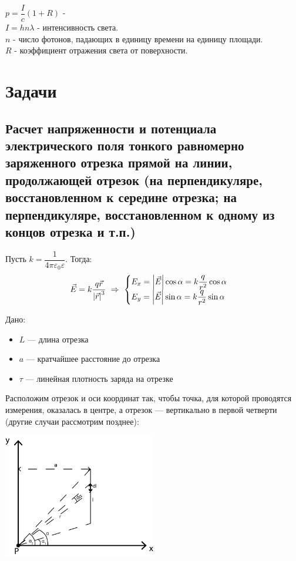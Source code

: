 \documentclass[12pt]{report}
\begin{document}
$p=\dfrac{I}{c}(1+R)$ - \\

$I=hn\lambda$ - интенсивность света.\\

$n$ - число фотонов, падающих в единицу времени на единицу
площади.\\

$R$ - коэффициент отражения света от поверхности.

\chapter{Задачи}
\section{Расчет напряженности и потенциала электрического поля тонкого равномерно заряженного отрезка прямой на линии, продолжающей отрезок (на перпендикуляре, восстановленном к середине отрезка; на перпендикуляре, восстановленном к одному из концов отрезка и т.п.)}
Пусть $k = \dfrac{1}{4\pi \varepsilon_0 \varepsilon}$. Тогда:
\[
    \vec{E} = k\dfrac{q\vec{r}}{\abs{\vec{r}}^3} \ \Rightarrow\ \begin{cases}
        E_x = \abs{\vec{E}} \cos{\alpha} = k\dfrac{q}{r^2} \cos{\alpha} \\
        E_y = \abs{\vec{E}} \sin{\alpha} = k\dfrac{q}{r^2} \sin{\alpha}
    \end{cases}
\]

Дано:
\begin{itemize}
    \item $L$ --- длина отрезка
    \item $a$ --- кратчайшее расстояние до отрезка
    \item $\tau$ --- линейная плотность заряда на отрезке
\end{itemize}

Расположим отрезок и оси координат так, чтобы точка, для которой проводятся измерения, оказалась в центре, а отрезок --- вертикально в первой четверти (другие случаи рассмотрим позднее):

\begin{center}
    \includegraphics[width=0.5\textwidth]{graphics/t01.png}
\end{center}
\end{document}
